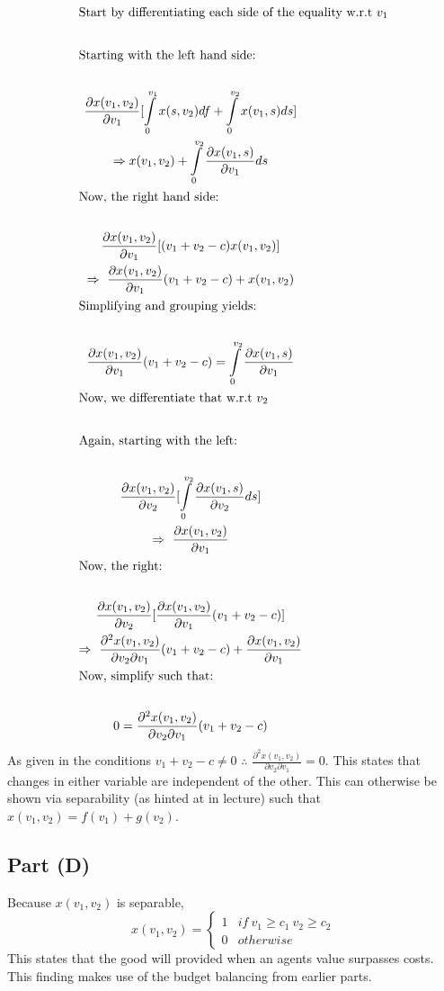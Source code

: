 \documentclass[10pt,a4paper]{article}
\begin{document}
    \begin{gather*}
      \shortintertext{Start by differentiating each side of the equality w.r.t $v_1$} \\
      \shortintertext{Starting with the left hand side:} \\
      \frac{\partial x(v_1,v_2)}{\partial v_1}[\int\limits_0^{v_1}x(s,v_2)df+\int\limits_0^{v_2}x(v_1,s)ds] \\
      \Rightarrow x(v_1,v_2)+\int\limits_0^{v_2}\frac{\partial x(v_1,s)}{\partial v_1}ds \\
      \shortintertext{Now, the right hand side:} \\
      \frac{\partial x(v_1,v_2)}{\partial v_1}[(v_1+v_2-c)x(v_1,v_2)] \\
      \Rightarrow \ \frac{\partial x(v_1,v_2)}{\partial v_1}(v_1+v_2-c) + x(v_1,v_2) \\
      \shortintertext{Simplifying and grouping yields:} \\
      \frac{\partial x(v_1,v_2)}{\partial v_1}(v_1+v_2-c) = \int\limits_0^{v_2}\frac{\partial x(v_1,s)}{\partial v_1} \\
      \shortintertext{Now, we differentiate that w.r.t $v_2$} \\
      \shortintertext{Again, starting with the left:} \\
      \frac{\partial x(v_1,v_2)}{\partial v_2}[\int\limits_0^{v_2}\frac{\partial x(v_1,s)}{\partial v_2}ds] \\
      \Rightarrow \ \frac{\partial x(v_1,v_2)}{\partial v_1} \\
      \shortintertext{Now, the right:} \\
      \frac{\partial x(v_1,v_2)}{\partial v_2}[\frac{\partial x(v_1,v_2)}{\partial v_1}(v_1+v_2-c)] \\
      \Rightarrow \ \frac{\partial^2x(v_1,v_2)}{\partial v_2\partial v_1}(v_1+v_2-c) + \frac{\partial x(v_1,v_2)}{\partial v_1} \\
      \shortintertext{Now, simplify such that:} \\
      0 = \frac{\partial^2x(v_1,v_2)}{\partial v_2\partial v_1}(v_1+v_2-c) \\
    \end{gather*}
    As given in the conditions $v_1+v_2-c\ne0$ $\therefore$ $\frac{\partial^2x(v_1,v_2)}{\partial v_2\partial v_1}=0$. This states that changes in either variable are independent of the other. This can otherwise be shown via separability (as hinted at in lecture) such that $x(v_1,v_2)=f(v_1)+g(v_2)$. 
  \subsection*{Part (D)}
    Because $x(v_1,v_2)$ is separable, 
    \begin{equation}
      x(v_1,v_2) = \begin{cases}
        1& if \ v_1\geq c_1 \ v_2\geq c_2 \\
        0& otherwise
      \end{cases}
    \end{equation}
    This states that the good will provided when an agents value surpasses costs. This finding makes use of the budget balancing from earlier parts.
\end{document}
